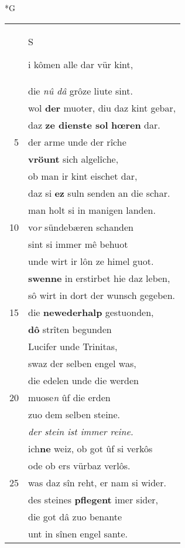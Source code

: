 \documentclass[8pt,a4paper,notitlepage]{article}
\begin{document}
\begin{table}[ht]
\begin{minipage}[t]{0.5\linewidth}
\small
\begin{center}*G
\end{center}
\begin{tabular}{rl}
 & \begin{large}S\end{large}i kômen alle dar vür kint,\\ 
 & die \textit{nû dâ} grôze liute sint.\\ 
 & wol \textbf{der} muoter, diu daz kint gebar,\\ 
 & daz \textbf{ze dienste sol} \textbf{hœren} dar.\\ 
5 & der arme unde der rîche\\ 
 & \textbf{vröunt} sich algelîche,\\ 
 & ob man ir kint eischet dar,\\ 
 & daz si \textbf{ez} suln senden an die schar.\\ 
 & man holt si in manigen landen.\\ 
10 & vo\textit{r} sündebæren schanden\\ 
 & sint si immer mê behuot\\ 
 & unde wirt ir lôn ze himel guot.\\ 
 & \textbf{swenne} in erstirbet hie daz leben,\\ 
 & sô wirt in dort der wunsch gegeben.\\ 
15 & die \textbf{newederhalp} gestuonden,\\ 
 & \textbf{dô} strîten begunden\\ 
 & Lucifer unde Trinitas,\\ 
 & swaz der selben engel was,\\ 
 & die edelen unde die werden\\ 
20 & muose\textit{n} ûf die erden\\ 
 & zuo dem selben steine.\\ 
 & \textit{der stein ist immer reine.}\\ 
 & ich\textbf{ne} weiz, ob got ûf si verkôs\\ 
 & ode ob ers vürbaz verlôs.\\ 
25 & was daz sîn reht, er nam si wider.\\ 
 & des steines \textbf{pflegent} imer sider,\\ 
 & die got dâ zuo benante\\ 
 & unt in sînen engel sante.\\ 

\end{tabular}
\end{minipage}
\end{table}
\end{document}
